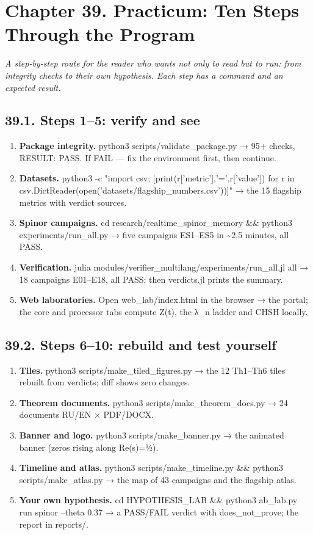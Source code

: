 \documentclass[11pt,a4paper]{article}
\begin{document}
\section{Chapter 39. Practicum: Ten Steps Through the Program}

\noindent\textit{\color{copper}A step-by-step route for the reader who wants not only to read but to run: from integrity checks to their own hypothesis. Each step has a command and an expected result.}

\subsection{39.1. Steps 1–5: verify and see}

\begin{enumerate}
  \item \textbf{Package integrity.} python3 scripts/validate\_package.py → 95+ checks, RESULT: PASS. If FAIL — fix the environment first, then continue.
  \item \textbf{Datasets.} python3 -c "import csv; [print(r['metric'],'=',r['value']) for r in csv.DictReader(open('datasets/flagship\_numbers.csv'))]" → the 15 flagship metrics with verdict sources.
  \item \textbf{Spinor campaigns.} cd research/realtime\_spinor\_memory \&\& python3 experiments/run\_all.py → five campaigns ES1–ES5 in \textasciitilde{}2.5 minutes, all PASS.
  \item \textbf{Verification.} julia modules/verifier\_multilang/experiments/run\_all.jl all → 18 campaigns E01–E18, all PASS; then verdicts.jl prints the summary.
  \item \textbf{Web laboratories.} Open web\_lab/index.html in the browser → the portal; the core and processor tabs compute Z(t), the λ\_n ladder and CHSH locally.
\end{enumerate}

\subsection{39.2. Steps 6–10: rebuild and test yourself}

\begin{enumerate}
  \item \textbf{Tiles.} python3 scripts/make\_tiled\_figures.py → the 12 Th1–Th6 tiles rebuilt from verdicts; diff shows zero changes.
  \item \textbf{Theorem documents.} python3 scripts/make\_theorem\_docs.py → 24 documents RU/EN × PDF/DOCX.
  \item \textbf{Banner and logo.} python3 scripts/make\_banner.py → the animated banner (zeros rising along Re(s)=½).
  \item \textbf{Timeline and atlas.} python3 scripts/make\_timeline.py \&\& python3 scripts/make\_atlas.py → the map of 43 campaigns and the flagship atlas.
  \item \textbf{Your own hypothesis.} cd HYPOTHESIS\_LAB \&\& python3 ab\_lab.py run spinor --theta 0.37 → a PASS/FAIL verdict with does\_not\_prove; the report in reports/.
\end{enumerate}
\end{document}
